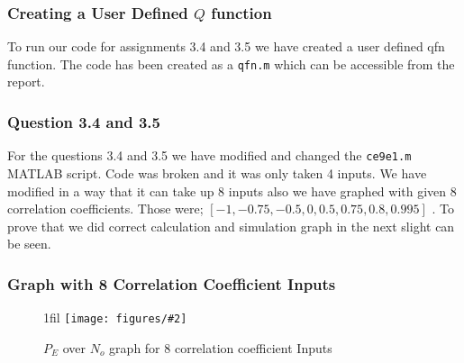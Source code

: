 \documentclass{beamer}
\makeatletter
\newcommand{\code}[1]{\texttt{#1}}
\newcommand*{\centerfloat}{%
  \parindent \z@
  \leftskip \z@ \@plus 1fil \@minus \textwidth
  \rightskip\leftskip
  \parfillskip \z@skip}
\newcommand{\fig}[3]{
  \begin{figure}[H]
  \centerfloat
    \texttt{[image: figures/\#2]}
    \caption{#3}
  \end{figure}
}
\makeatother
\begin{document}
\begin{frame}
	\frametitle{Creating a User Defined $Q$ function}
To run our code for assignments 3.4 and 3.5 we have created a user defined  qfn function. The code has been created as a \code{qfn.m} which can be accessible from the report.
\end{frame}
 
\begin{frame}
	\frametitle{Question 3.4 and 3.5}
For the questions 3.4  and 3.5 we have modified and changed the \code{ce9e1.m} MATLAB script. Code was broken and it was only taken 4 inputs. We have modified in a way that it can take up 8 inputs also we have graphed with given 8 correlation coefficients. Those were;
$[-1, -0.75, -0.5, 0, 0.5, 0.75, 0.8 ,0.995]$ . To prove that we did correct calculation and simulation graph in the next slight can be seen.
\end{frame}

\begin{frame}
	\frametitle{Graph with 8 Correlation Coefficient Inputs}
	\fig{5cm}{question351.png}{$P_E $ over $N_o$ graph for 8 correlation coefficient Inputs}
\end{frame}
\end{document}
